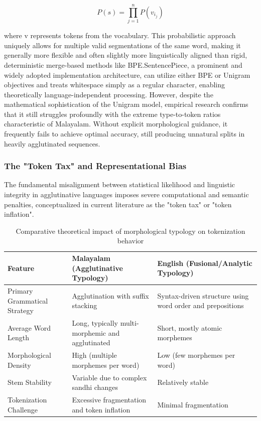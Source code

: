 \documentclass[12pt]{article}
\begin{document}
	\begin{equation}
		P(s) = \prod_{j=1}^{n} P(v_{i_j})
	\end{equation}
	
	where v represents tokens from the vocabulary. This probabilistic approach uniquely allows for multiple valid segmentations of the same word, making it generally more flexible and often slightly more linguistically aligned than rigid, deterministic merge-based methods like BPE.SentencePiece, a prominent and widely adopted implementation architecture, can utilize either BPE or Unigram objectives and treats whitespace simply as a regular character, enabling theoretically language-independent processing. However, despite the mathematical sophistication of the Unigram model, empirical research confirms that it still struggles profoundly with the extreme type-to-token ratios characteristic of Malayalam. Without explicit morphological guidance, it frequently fails to achieve optimal accuracy, still producing unnatural splits in heavily agglutinated sequences. 
	
	\subsubsection{The "Token Tax" and Representational Bias}
	
	The fundamental misalignment between statistical likelihood and linguistic integrity in agglutinative languages imposes severe computational and semantic penalties, conceptualized in current literature as the "token tax" or "token inflation". 
	
	\begin{table}[h]
		\centering
		\renewcommand{\arraystretch}{1.3}
		\begin{tabularx}{\textwidth}{l X X}
			\toprule
			\textbf{Feature} & \textbf{Malayalam (Agglutinative Typology)} & \textbf{English (Fusional/Analytic Typology)} \\
			\midrule
			
			Primary Grammatical Strategy 
			& Agglutination with suffix stacking 
			& Syntax-driven structure using word order and prepositions \\
			
			Average Word Length 
			& Long, typically multi-morphemic and agglutinated 
			& Short, mostly atomic morphemes \\
			
			Morphological Density 
			& High (multiple morphemes per word) 
			& Low (few morphemes per word) \\
			
			Stem Stability 
			& Variable due to complex sandhi changes 
			& Relatively stable \\
			
			Tokenization Challenge 
			& Excessive fragmentation and token inflation 
			& Minimal fragmentation \\
			
			\bottomrule
		\end{tabularx}
		\caption{Comparative theoretical impact of morphological typology on tokenization behavior}
	\end{table}
	
\end{document}
